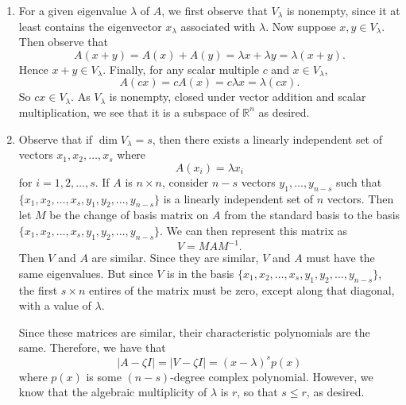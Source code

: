 \documentclass[12pt,letterpaper,boxed]{math_hw_pset}
\newcommand{\rr}{\mathbb{R}}
\newcommand{\<}{\left<}
\renewcommand{\>}{\right>}
\begin{document}
\begin{solution}
\begin{enumerate}
        \item For a given eigenvalue $\lambda$ of $A$, we first observe that $V_\lambda$ is 
        nonempty, since it at least contains the eigenvector $x_\lambda$ associated with $\lambda$. 
        Now suppose $x, y \in V_\lambda$. Then observe that 
        \[
            A(x  + y) = A(x) + A(y) = \lambda x + \lambda y = \lambda(x + y).
        \]
        Hence $x + y \in V_\lambda$. Finally, for any scalar multiple $c$ and $x \in V_\lambda$, 
        \[
            A(cx) = cA(x) = c\lambda x = \lambda(cx).
        \]
        So $cx \in V_\lambda$.
        As $V_\lambda$ is nonempty, closed under vector addition and scalar multiplication, 
        we see that it is a subspace of $\rr^n$ as desired. 

        \item Observe that if $\dim V_{\lambda} = s$, then there exists a 
        linearly independent set of vectors $x_1, x_2, \dots, x_s$ where 
        \[
            A(x_i) = \lambda x_i
        \]
        for $i=1,2,\dots, s$. If $A$ is $n\times n$, consider $n -  s$ 
        vectors $y_1, \dots, y_{n-s}$ such that $\{x_1, x_2, \dots, x_s, y_1, y_2, \dots, y_{n-s}\}$ 
        is a linearly independent set of $n$ vectors. 
        Then let $M$ be the change of basis matrix on $A$ 
        from the standard basis to the basis\\
        $\{x_1, x_2, \dots, x_s, y_1, y_2, \dots, y_{n-s}\}$.
        We can then represent this matrix as
        \[
            V = MAM^{-1}.
        \]
        Then $V$ and $A$ are similar. Since they are similar, $V$ and $A$ 
        must have the same eigenvalues. But since $V$ is in the basis
        $\{x_1, x_2, \dots, x_s, y_1, y_2, \dots, y_{n-s}\}$, the 
        first $s\times n$ entires of the matrix must be zero, except along
        that diagonal, with a value of $\lambda$. 

        Since these matrices are similar, their characteristic polynomials 
        are the same. Therefore, we have that 
        \[
            |A - \zeta I| = |V - \zeta I| = (x - \lambda)^sp(x)
        \]
        where $p(x)$ is some $(n -s)$-degree complex polynomial. 
        However, we know that the algebraic multiplicity of $\lambda$ is 
        $r$, so that $s \le r$, as desired. 



    \end{enumerate}
\end{solution}
\end{document}
